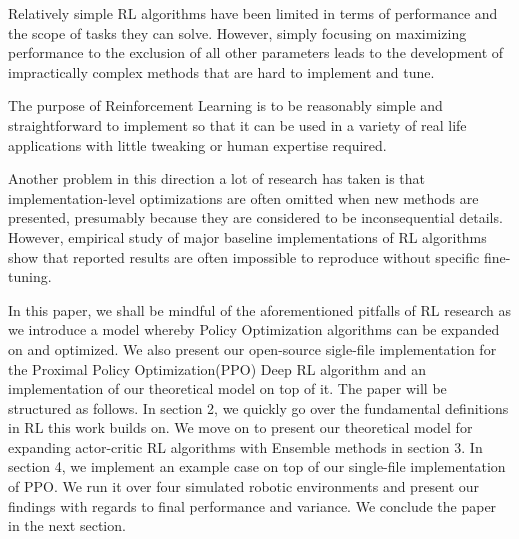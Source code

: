 Relatively simple RL algorithms have been limited in terms of performance and the scope of tasks they can solve. However, simply focusing on maximizing performance to the exclusion of all other parameters leads to the development of impractically complex methods that are hard to implement and tune.%

The purpose of Reinforcement Learning is to be reasonably simple and straightforward to implement so that it can be used in a variety of real life applications with little tweaking or human expertise required.

Another problem in this direction a lot of research has taken is that implementation-level optimizations are often omitted when new methods are presented, presumably because they are considered to be inconsequential details. However, empirical study of  major baseline implementations of RL algorithms show that reported results are often impossible to reproduce without specific fine-tuning\cite{henderson2018deep}\cite{islam2017reproducibility}\cite{andrychowicz2021matters}\cite{dossa2021empirical}.


In this paper, we shall be mindful of the aforementioned pitfalls of RL research as we introduce a model whereby Policy Optimization algorithms can be expanded on and optimized. We also present our open-source sigle-file implementation for the Proximal Policy Optimization\cite{schulman2017proximal}(PPO) Deep RL algorithm and an implementation of our theoretical model on top of it. The paper will be structured as follows. In section 2, we quickly go over the fundamental definitions in RL this work builds on. We move on to present our theoretical model for expanding actor-critic RL algorithms with Ensemble methods in section 3. In section 4, we implement an example case on top of our single-file implementation of PPO. We run it over four simulated robotic environments and present our findings with regards to final performance and variance. We conclude the paper in the next section.